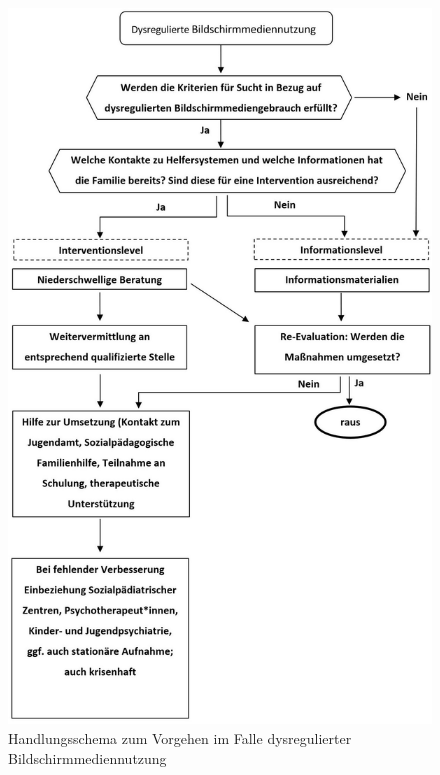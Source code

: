 \documentclass[
  letterpaper,
  DIV=11]{scrartcl}
\begin{document}
\begin{figure}

{\centering \includegraphics{images/handlungsschema.jpg}

}

\caption{\label{fig-handlungsschema}Handlungsschema zum Vorgehen im
Falle dysregulierter Bildschirmmediennutzung}

\end{figure}
\end{document}
